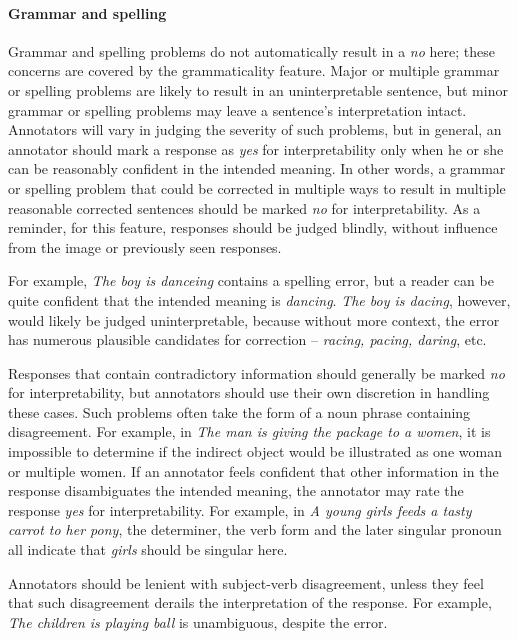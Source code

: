\documentclass[12pt]{article}
\begin{document}
\paragraph{Grammar and spelling} \label{para:interp-grammar} Grammar and spelling problems do not automatically result in a \textit{no} here; these concerns are covered by the grammaticality feature. Major or multiple grammar or spelling problems are likely to result in an uninterpretable sentence, but minor grammar or spelling problems may leave a sentence's interpretation intact. Annotators will vary in judging the severity of such problems, but in general, an annotator should mark a response as \textit{yes} for interpretability only when he or she can be reasonably confident in the intended meaning. In other words, a grammar or spelling problem that could be corrected in multiple ways to result in multiple reasonable corrected sentences should be marked \textit{no} for interpretability. As a reminder, for this feature, responses should be judged blindly, without influence from the image or previously seen responses.

For example, \textit{The boy is danceing} contains a spelling error, but a reader can be quite confident that the intended meaning is \textit{dancing}. \textit{The boy is dacing}, however, would likely be judged uninterpretable, because without more context, the error has numerous plausible candidates for correction -- \textit{racing, pacing, daring}, etc.

Responses that contain contradictory information should generally be marked \textit{no} for interpretability, but annotators should use their own discretion in handling these cases. Such problems often take the form of a noun phrase containing disagreement. For example, in \textit{The man is giving the package to a women}, it is impossible to determine if the indirect object would be illustrated as one woman or multiple women. If an annotator feels confident that other information in the response disambiguates the intended meaning, the annotator may rate the response \textit{yes} for interpretability. For example, in \textit{A young girls feeds a tasty carrot to her pony}, the determiner, the verb form and the later singular pronoun all indicate that \textit{girls} should be singular here.

Annotators should be lenient with subject-verb disagreement, unless they feel that such disagreement derails the interpretation of the response. For example, \textit{The children is playing ball} is unambiguous, despite the error.
\end{document}
